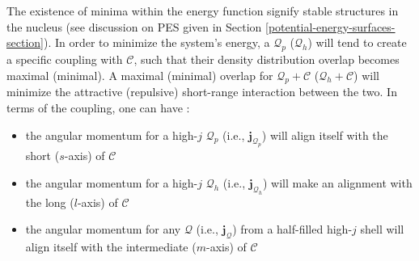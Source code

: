 The existence of minima within the energy function signify stable structures in the nucleus (see discussion on PES given in Section \ref{potential-energy-surfaces-section}). In order to minimize the system's energy, a $\mathcal{Q}_p$ ($\mathcal{Q}_h$) will tend to create a specific coupling with $\mathscr{C}$, such that their density distribution overlap becomes maximal (minimal). A maximal (minimal) overlap for $\mathcal{Q}_p+\mathscr{C}$ ($\mathcal{Q}_h+\mathscr{C}$) will minimize the attractive (repulsive) short-range interaction between the two. In terms of the coupling, one can have \cite{frauendorf2014transverse}:
\begin{itemize}
    \item the angular momentum for a high-$j$ $\mathcal{Q}_p$ (i.e., $\mathbf{j}_{\mathcal{Q}_p}$) will align itself with the short ($s$-axis) of $\mathscr{C}$ 
    \item the angular momentum for a high-$j$ $\mathcal{Q}_h$ (i.e., $\mathbf{j}_{\mathcal{Q}_h}$) will make an alignment with the long ($l$-axis) of $\mathscr{C}$
    \item the angular momentum for any $\mathcal{Q}$ (i.e., $\mathbf{j}_{\mathcal{Q}}$) from a half-filled high-$j$ shell will align itself with the intermediate ($m$-axis) of $\mathscr{C}$
\end{itemize}

